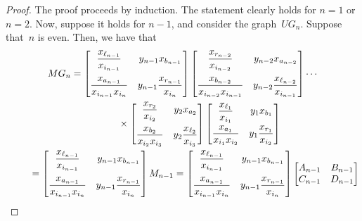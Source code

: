 \documentclass[11pt]{article}
\numberwithin{equation}{section}
\begin{document}
\begin{proof} The proof proceeds by induction. The statement clearly holds for $n = 1$ or $n = 2$. Now, suppose it holds for $n-1$, and consider the graph~$UG_n$. Suppose that~$n$ is even. Then, we have that
\begin{gather*}
MG_n = \begin{bmatrix}\dfrac{x_{\ell_{n-1}}}{x_{i_{n-1}}} & y_{n-1} x_{b_{n-1}} \vspace{2mm}\\ \dfrac{x_{a_{n-1}}}{x_{i_{n-1}}x_{i_n}} & y_{n-1} \dfrac{x_{r_{n-1}}}{x_{i_n}} \end{bmatrix} \begin{bmatrix} \dfrac{x_{r_{n-2}}}{x_{i_{n-2}}} & y_{n-2} x_{a_{n-2}} \vspace{2mm}\\ \dfrac{x_{b_{n-2}}}{x_{i_{n-2}}x_{i_{n-1}}} & y_{n-2} \dfrac{x_{\ell_{n-2}}}{x_{i_{n-1}}} \end{bmatrix} \cdots\\
\hphantom{MG_n=}{}\times
 \begin{bmatrix}\dfrac{x_{r_2}}{x_{i_2}} & y_2 x_{a_2} \vspace{2mm}\\ \dfrac{x_{b_2}}{x_{i_2}x_{i_3}} & y_2 \dfrac{x_{\ell_2}}{x_{i_3}} \end{bmatrix} \begin{bmatrix} \dfrac{x_{\ell_1}}{x_{i_1}} & y_1 x_{b_1} \vspace{1mm}\\ \dfrac{x_{a_1}}{x_{i_1}x_{i_2}} & y_1 \dfrac{x_{r_1}}{x_{i_2}} \end{bmatrix}
\\
\hphantom{MG_n}{}
= \begin{bmatrix}\dfrac{x_{\ell_{n-1}}}{x_{i_{n-1}}} & y_{n-1} x_{b_{n-1}} \vspace{2mm}\\ \dfrac{x_{a_{n-1}}}{x_{i_{n-1}}x_{i_n}} & y_{n-1} \dfrac{x_{r_{n-1}}}{x_{i_n}} \end{bmatrix} M_{n-1} = \begin{bmatrix}\dfrac{x_{\ell_{n-1}}}{x_{i_{n-1}}} & y_{n-1} x_{b_{n-1}} \vspace{2mm} \\ \dfrac{x_{a_{n-1}}}{x_{i_{n-1}}x_{i_n}} & y_{n-1} \dfrac{x_{r_{n-1}}}{x_{i_n}} \end{bmatrix} \begin{bmatrix} A_{n-1} & B_{n-1} \\ C_{n-1} & D_{n-1} \end{bmatrix}

\end{gather*}
\end{proof}
\end{document}
